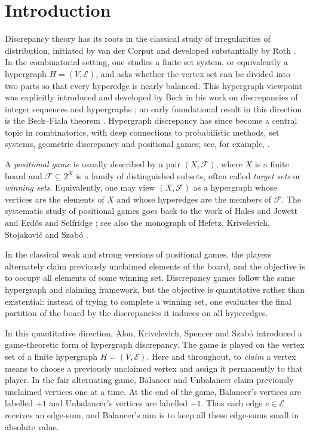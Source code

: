 \documentclass[twoside,12pt]{article}
\numberwithin{equation}{section}
\begin{document}
\section{Introduction}
Discrepancy theory has its roots in the classical study of irregularities of
distribution, initiated by van der Corput and developed substantially by Roth
\cite{vanderCorput1935,Roth1954}.  In the combinatorial setting, one studies a
finite set system, or equivalently a hypergraph \(H=(V,\mathcal E)\), and asks
whether the vertex set can be divided into two parts so that every hyperedge is
nearly balanced.  
This hypergraph viewpoint was explicitly
introduced and developed by Beck in his work on discrepancies of integer
sequences and hypergraphs \cite{Beck1981Roth}; an early foundational result in
this direction is the Beck--Fiala theorem \cite{BeckFiala1981}.  Hypergraph
discrepancy has since become a central topic in combinatorics, with deep
connections to probabilistic methods, set systems, geometric discrepancy and
positional games; see, for example,
\cite{Beck,Chazelle,Matousek,Spencer85}.

A \emph{positional game} is usually described by a pair
\((X,\mathcal F)\), where \(X\) is a finite board and
\(\mathcal F\subseteq 2^X\) is a family of distinguished subsets,
often called \emph{target sets} or \emph{winning sets}. Equivalently, one may view
\((X,\mathcal F)\) as a hypergraph whose vertices are the elements of
\(X\) and whose hyperedges are the members of \(\mathcal F\).
The systematic study of positional games goes back to the work of
Hales and Jewett \cite{HJ63} and Erd\H{o}s and Selfridge
\cite{ErdosSelfridge}; see also the monograph of Hefetz,
Krivelevich, Stojakovi\'c and Szab\'o \cite{HKSS14}.

In the classical weak and strong versions of positional games, the
players alternately claim previously unclaimed elements of the board,
and the objective is to occupy all elements of some winning set.
Discrepancy games follow the same hypergraph and claiming framework,
but the objective is quantitative rather than existential: instead of
trying to complete a winning set, one evaluates the final partition of
the board by the discrepancies it induces on all hyperedges.

In this quantitative direction, Alon, Krivelevich, Spencer and
Szab\'o \cite{AKSS} introduced a game-theoretic form of hypergraph
discrepancy. The game is played on the vertex set of a finite hypergraph
\(H=(V,\mathcal E)\). Here and throughout, to \emph{claim} a vertex means
to choose a previously unclaimed vertex and assign it permanently to that
player. In the fair alternating game, Balancer and Unbalancer claim
previously unclaimed vertices one at a time. At the end of the game,
Balancer's vertices are labelled \(+1\) and Unbalancer's vertices are
labelled \(-1\). Thus each edge \(e\in\mathcal E\) receives an edge-sum,
and Balancer's aim is to keep all these edge-sums small in absolute
value.
\end{document}
